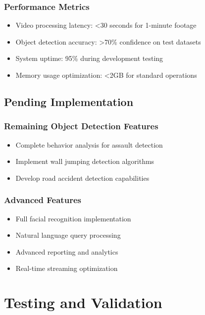 \documentclass[12pt,a4paper]{article}
\begin{document}
\subsubsection{Performance Metrics}
\begin{itemize}
    \item Video processing latency: <30 seconds for 1-minute footage
    \item Object detection accuracy: >70\% confidence on test datasets
    \item System uptime: 95\% during development testing
    \item Memory usage optimization: <2GB for standard operations
\end{itemize}

\subsection{Pending Implementation}

\subsubsection{Remaining Object Detection Features}
\begin{itemize}
    \item Complete behavior analysis for assault detection
    \item Implement wall jumping detection algorithms
    \item Develop road accident detection capabilities
\end{itemize}

\subsubsection{Advanced Features}
\begin{itemize}
    \item Full facial recognition implementation
    \item Natural language query processing
    \item Advanced reporting and analytics
    \item Real-time streaming optimization
\end{itemize}

\clearpage

\section{Testing and Validation}
\end{document}
